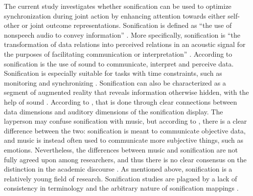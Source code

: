 \documentclass[10pt,a4paper,onecolumn]{article}
\begin{document}
The current study investigates whether sonification can be used to optimize synchronization during joint action by enhancing attention towards either self-other or joint outcome representations. Sonification is defined as ``the use of nonspeech audio to convey information'' \autocite[p.~4]{kramerSonificationReportStatus1999}. More specifically, sonification is ``the transformation of data relations into perceived relations in an acoustic signal for the purposes of facilitating communication or interpretation'' \autocite[p.~4]{kramerSonificationReportStatus1999}. According to \textcite{dubusInteractiveSonificationMotion2013} sonification is the use of sound to communicate, interpret and perceive data. Sonification is especially suitable for tasks with time constraints, such as monitoring and synchronizing \autocite{dubusInteractiveSonificationMotion2013}. Sonification can also be characterized as a segment of augmented reality that reveals information otherwise hidden, with the help of sound \autocite{dubusInteractiveSonificationMotion2013}. According to \textcite{dubusInteractiveSonificationMotion2013}, that is done through clear connections between data dimensions and auditory dimensions of the sonification display. The layperson may confuse sonification with music, but according to \textcite{dubusInteractiveSonificationMotion2013}, there is a clear difference between the two: sonification is meant to communicate objective data, and music is instead often used to communicate more subjective things, such as emotions. Nevertheless, the differences between music and sonification are not fully agreed upon among researchers, and thus there is no clear consensus on the distinction in the academic discourse \autocite{dubusInteractiveSonificationMotion2013}. As mentioned above, sonification is a relatively young field of research. Sonification studies are plagued by a lack of consistency in terminology and the arbitrary nature of sonification mappings \autocite{dubusInteractiveSonificationMotion2013,dubusSystematicReviewMapping2013}.
\end{document}
